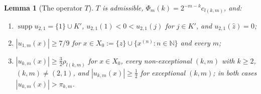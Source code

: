 \documentclass[10pt]{amsart}
\newtheorem{lemma}[theorem]{Lemma}
\theoremstyle{definition}
\theoremstyle{remark}
\newcommand{\supp}{\operatorname{supp}}
\newcommand{\N}{\mathbb N}
\newcommand{\zh}{\hat z}
\begin{document}
\begin{lemma}[The operator $T$]\label{lem:T}
$T$ is admissible, $\Phi_m(k)=2^{-m-k}c_{l(k,m)}$, and:
\begin{enumerate}
\item[(P1)] $\supp u_{2,1}=\{1\}\cup K'$, $u_{2,1}(1)<0<u_{2,1}(j)$ for
$j\in K'$, and $u_{2,1}(\zh)=0$;
\item[(P2)] $|u_{1,m}(x)|\ge7/9$ for $x\in X_0:=\{\zh\}\cup\{x^{(n)}:n\in\N\}$
and every $m$;
\item[(P3)] $|u_{k,m}(x)|\ge\frac32\rho_{l(k,m)}$ for $x\in X_0$, every
non-exceptional $(k,m)$ with $k\ge2$, $(k,m)\ne(2,1)$, and
$|u_{k,m}(x)|\ge\frac12$ for exceptional $(k,m)$; in both cases
$|u_{k,m}(x)|>\pi_{k,m}$.
\end{enumerate}
\end{lemma}
\end{document}
